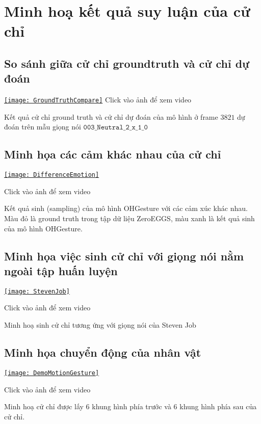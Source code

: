 \chapter{Minh hoạ kết quả suy luận của cử chỉ}
\label{Appendix3}

\section{So sánh giữa cử chỉ groundtruth và cử chỉ dự đoán}


\begin{center}
\centering
\href{https://youtu.be/22lNm2tvmrk}{%
\texttt{[image: GroundTruthCompare]}}
{\tiny Click vào ảnh để xem video}
\end{center}

Kết quả cử chỉ ground truth và cử chỉ dự đoán của mô hình ở frame $3821$ dự đoán trên mẫu giọng nói $\texttt{003\_Neutral\_2\_x\_1\_0}$

\section{Minh họa các cảm khác nhau của cử chỉ}

{
	\begin{center}
		\centering
		\href{https://youtu.be/KUlBZXLtYJ4}{%
			\texttt{[image: DifferenceEmotion]}}
		
		{\tiny Click vào ảnh để xem video}
	\end{center}
}

Kết quả sinh (sampling) của mô hình OHGesture với các cảm xúc khác nhau. Màu đỏ là ground truth trong tập dữ liệu ZeroEGGS, màu xanh là kết quả sinh của mô hình OHGesture.

\section{Minh họa việc sinh cử chỉ với giọng nói nằm ngoài tập huấn luyện}

{
	\begin{center}
		\centering
		\href{https://www.youtube.com/watch?v=B6nv1kQmi-Q}{%
		\texttt{[image: StevenJob]}}
		
		{\tiny Click vào ảnh để xem video}
	\end{center}

}

Minh hoạ sinh cử chỉ tương ứng với giọng nói của Steven Job



\section{Minh họa chuyển động của nhân vật}

\begin{center}
{
	\centering
	\href{https://www.youtube.com/watch?v=9IIIZP3EJLg}{%
	\texttt{[image: DemoMotionGesture]}}
	
	{\tiny Click vào ảnh để xem video}
}
\end{center}
Minh hoạ cử chỉ được lấy 6 khung hình phía trước và 6 khung hình phía sau của cử chỉ.